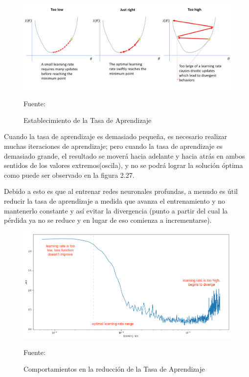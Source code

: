		\begin{figure}[H]
		\includegraphics[width=1\textwidth]{images/desarrollo/entrenamiento/LR}
		\begin{center}
		\caption{\small{Establecimiento de la Tasa de Aprendizaje}}
		\vspace{-0.5em}
		{\small{Fuente: \cite{AdamImg}}}
		\end{center}
		\vspace{-1.5em}
		\end{figure}

		Cuando la tasa de aprendizaje es demasiado pequeña, es necesario realizar muchas iteraciones de aprendizaje; pero cuando la tasa de aprendizaje es demasiado grande, el resultado se moverá hacia adelante y hacia atrás en ambos sentidos de los valores extremos(oscila), y no se podrá lograr la solución óptima como puede ser observado en la figura 2.27.

		Debido a esto es que al entrenar redes neuronales profundas, a menudo es útil reducir la tasa de aprendizaje a medida que avanza el entrenamiento y no mantenerlo constante y así evitar la divergencia (punto a partir del cual la pérdida ya no se reduce y en lugar de eso comienza a incrementarse).


		\begin{figure}[H]
		\includegraphics[width=1\textwidth]{images/desarrollo/entrenamiento/lr_finder}
		\begin{center}
		\caption{\small{Comportamientos en la reducción de la Tasa de Aprendizaje}}
		{\small{Fuente: \cite{AdamImg}}}
		\end{center}
		\vspace{-1.5em}
		\end{figure}

